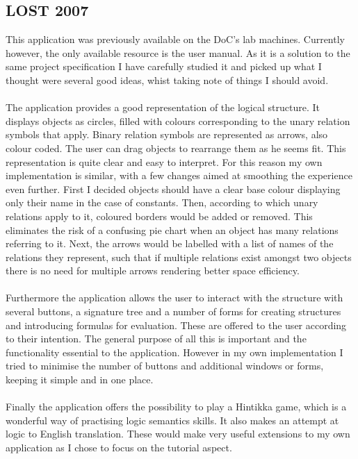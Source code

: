 \documentclass{report}
\begin{document}
\subsection{LOST 2007}
This application was previously available on the DoC's lab machines. Currently 
however, the only available resource is the user manual. As it is a solution to 
the same project specification I have carefully studied it and picked up what I 
thought were several good ideas, whist taking note of things I should avoid.
\\ \\
The application provides a good representation of the logical structure. It 
displays objects as circles, filled with colours corresponding to the unary 
relation symbols that apply. Binary relation symbols are represented as arrows, 
also colour coded. The user can drag objects to rearrange them as he seems fit. 
This representation is quite clear and easy to interpret. For this reason my own
implementation is similar, with a few changes aimed at smoothing the experience
even further. First I decided objects should have a clear base colour 
displaying only their name in the case of constants. Then, according to which 
unary relations apply to it, coloured borders would be added or removed. This 
eliminates the risk of a confusing pie chart when an object has many relations 
referring to it. Next, the arrows would be labelled with a list of names of the 
relations they represent, such that if multiple relations exist amongst two 
objects there is no need for multiple arrows rendering better space efficiency.
\\ \\
Furthermore the application allows the user to interact with the structure with 
several buttons, a signature tree and a number of forms for creating structures 
and introducing formulas for evaluation. These are offered to the user according 
to their intention. The general purpose of all this is important and the 
functionality essential to the application. However in my own implementation I 
tried to minimise the number of buttons and additional windows or forms, keeping 
it simple and in one place. \\ \\
Finally the application offers the possibility to play a Hintikka game, which is 
a wonderful way of practising logic semantics skills. It also makes an attempt 
at logic to English translation. These would make very useful extensions to my 
own application as I chose to focus on the tutorial aspect.
\end{document}
